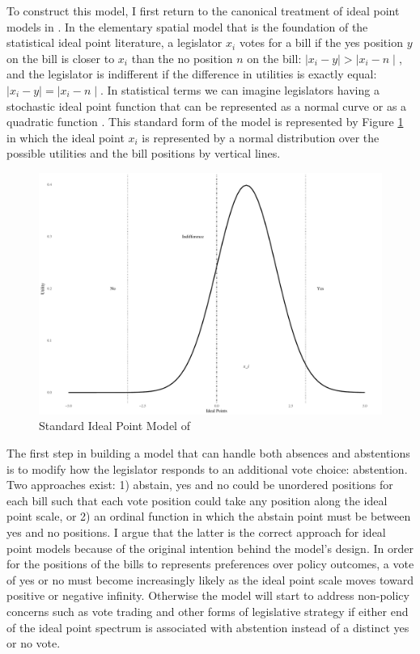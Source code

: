  	To construct this model, I first return to the canonical treatment of ideal point models in \textcite{enelow198}. In the elementary spatial model that is the foundation of the statistical ideal point literature, a legislator $x_i$ votes for a bill if the yes position $y$ on the bill is closer to $x_i$ than the no position $n$ on the bill: $\mid x_i-y \mid > \mid x_i - n \mid$, and the legislator is indifferent if the difference in utilities is exactly equal: $\mid x_i-y \mid = \mid x_i - n \mid$. In statistical terms we can imagine legislators having a stochastic ideal point function that can be represented as a normal curve or as a quadratic function \parencite{carroll2009}. This standard form of the model is represented by Figure \ref{ehinich} in which the ideal point $x_i$ is represented by a normal distribution over the possible utilities and the bill positions by vertical lines.
 	\begin{figure}[h!]
 		\caption{Standard Ideal Point Model of \textcite{enelow198}}\label{ehinich}
 		\includegraphics[width=0.9\linewidth]{standard_ideal_pt}
 	\end{figure}
 
 	The first step in building a model that can handle both absences and abstentions is to modify how the legislator responds to an additional vote choice: abstention. Two approaches exist: 1) abstain, yes and no could be unordered positions for each bill such that each vote position could take any position along the ideal point scale, or 2) an ordinal function in which the abstain point must be between yes and no positions. I argue that the latter is the correct approach for ideal point models because of the original intention behind the model's design. In order for the positions of the bills to represents preferences over policy outcomes, a vote of yes or no must become increasingly likely as the ideal point scale moves toward positive or negative infinity. Otherwise the model will start to address non-policy concerns such as vote trading and other forms of legislative strategy if either end of the ideal point spectrum is associated with abstention instead of a distinct yes or no vote. 
 	
